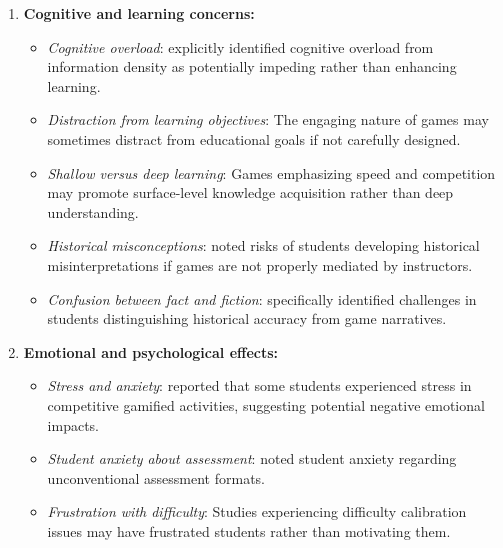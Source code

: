 \documentclass[a4paper,fleqn]{cas-sc}
\begin{document}
\begin{enumerate}[noitemsep]
	\item 
\textbf{Cognitive and learning concerns:}

\begin{itemize}[noitemsep]
 \item \textit{Cognitive overload}: \citet{52Lin2011265} explicitly identified cognitive overload from information density as potentially impeding rather than enhancing learning.
 
 \item \textit{Distraction from learning objectives}: The engaging nature of games may sometimes distract from educational goals if not carefully designed.
 
 \item \textit{Shallow versus deep learning}: Games emphasizing speed and competition may promote surface-level knowledge acquisition rather than deep understanding.
 
 \item \textit{Historical misconceptions}: \citep{71lynch2015pedagogical, 72hutauruk2020utilization} noted risks of students developing historical misinterpretations if games are not properly mediated by instructors.
 
 \item \textit{Confusion between fact and fiction}: \citet{71lynch2015pedagogical} specifically identified challenges in students distinguishing historical accuracy from game narratives.
\end{itemize}

	\item 
\textbf{Emotional and psychological effects:}

\begin{itemize}[noitemsep]
 \item \textit{Stress and anxiety}: \citet{34Serrano2023} reported that some students experienced stress in competitive gamified activities, suggesting potential negative emotional impacts.
 
 \item \textit{Student anxiety about assessment}: \citet{60Hoy2018} noted student anxiety regarding unconventional assessment formats.
 
 \item \textit{Frustration with difficulty}: Studies experiencing difficulty calibration issues may have frustrated students rather than motivating them.
\end{itemize}


\end{enumerate}
\end{document}
